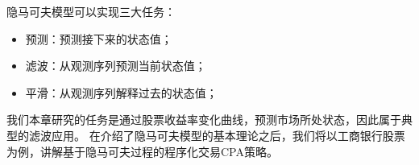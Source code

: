隐马可夫模型可以实现三大任务：
\begin{itemize}
\item 预测：预测接下来的状态值；
\item 滤波：从观测序列预测当前状态值；
\item 平滑：从观测序列解释过去的状态值；
\end{itemize}
我们本章研究的任务是通过股票收益率变化曲线，预测市场所处状态，因此属于典型的滤波应用。\newline
在介绍了隐马可夫模型的基本理论之后，我们将以工商银行股票为例，讲解基于隐马可夫过程的程序化交易CPA策略。
